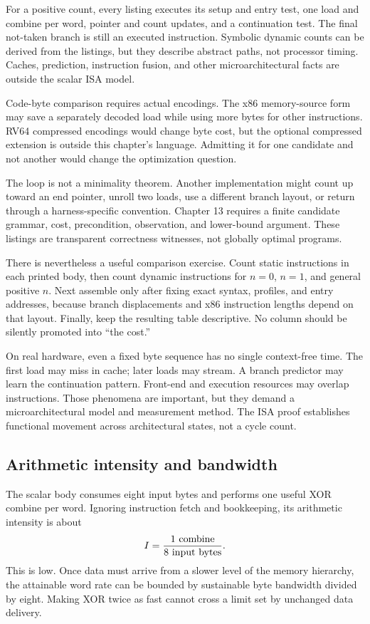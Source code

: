 For a positive count, every listing executes its setup and entry test, one
load and combine per word, pointer and count updates, and a continuation test.
The final not-taken branch is still an executed instruction. Symbolic dynamic
counts can be derived from the listings, but they describe abstract paths, not
processor timing. Caches, prediction, instruction fusion, and other
microarchitectural facts are outside the scalar ISA model.

Code-byte comparison requires actual encodings. The x86 memory-source form may
save a separately decoded load while using more bytes for other instructions.
RV64 compressed encodings would change byte cost, but the optional compressed
extension is outside this chapter's language. Admitting it for one candidate
and not another would change the optimization question.

The loop is not a minimality theorem. Another implementation might count up
toward an end pointer, unroll two loads, use a different branch layout, or
return through a harness-specific convention. Chapter 13 requires a finite
candidate grammar, cost, precondition, observation, and lower-bound argument.
These listings are transparent correctness witnesses, not globally optimal
programs.

There is nevertheless a useful comparison exercise. Count static instructions
in each printed body, then count dynamic instructions for \(n=0\), \(n=1\),
and general positive \(n\). Next assemble only after fixing exact syntax,
profiles, and entry addresses, because branch displacements and x86 instruction
lengths depend on that layout. Finally, keep the resulting table descriptive.
No column should be silently promoted into ``the cost.''

On real hardware, even a fixed byte sequence has no single context-free time.
The first load may miss in cache; later loads may stream. A branch predictor
may learn the continuation pattern. Front-end and execution resources may
overlap instructions. Those phenomena are important, but they demand a
microarchitectural model and measurement method. The ISA proof establishes
functional movement across architectural states, not a cycle count.

\subsection{Arithmetic intensity and bandwidth}

The scalar body consumes eight input bytes and performs one useful XOR combine
per word. Ignoring instruction fetch and bookkeeping, its arithmetic intensity
is about
\[
  I=\frac{1\ \hbox{combine}}{8\ \hbox{input bytes}}.
\]
This is low. Once data must arrive from a slower level of the memory
hierarchy, the attainable word rate can be bounded by sustainable byte
bandwidth divided by eight. Making XOR twice as fast cannot cross a limit set
by unchanged data delivery.

